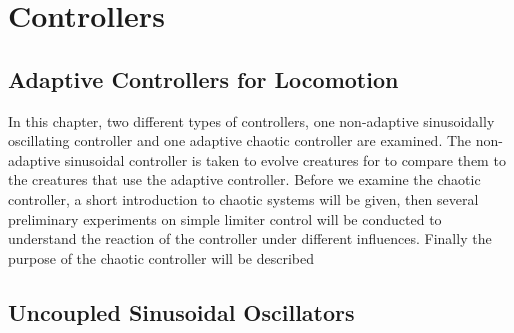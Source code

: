 \documentclass[main]{subfiles}
\begin{document}
\setcounter{chapter}{2}

\chapter{Controllers} %

\label{Chapter\thechapter} %


\section{Adaptive Controllers for Locomotion}

In this chapter, two different types of controllers, one non-adaptive sinusoidally oscillating controller and one adaptive chaotic controller are examined. %
%
The non-adaptive sinusoidal controller is taken to evolve creatures for to compare them to the creatures that use the adaptive controller. %
%
Before we examine the chaotic controller, a short introduction to chaotic systems will be given, then several preliminary experiments on simple limiter control will be conducted to understand the reaction of the controller under different influences. %
%
Finally the purpose of the chaotic controller will be described

%
\section{Uncoupled Sinusoidal Oscillators}
\label{sec:sinusoidal-oscillators}
\end{document}
